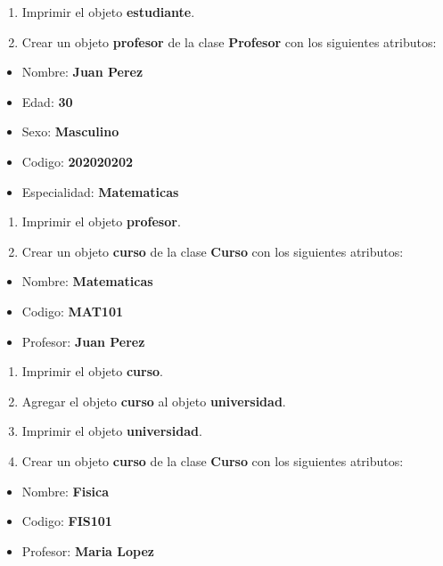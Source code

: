\documentclass[
  a4paper,
  DIV=11,
  numbers=noendperiod,
  onepage,
  openany]{scrreprt}
\begin{document}
\begin{enumerate}
\def\labelenumi{\arabic{enumi}.}
\setcounter{enumi}{8}
\item
  Imprimir el objeto \textbf{estudiante}.
\item
  Crear un objeto \textbf{profesor} de la clase \textbf{Profesor} con
  los siguientes atributos:
\end{enumerate}

\begin{itemize}
\item
  Nombre: \textbf{Juan Perez}
\item
  Edad: \textbf{30}
\item
  Sexo: \textbf{Masculino}
\item
  Codigo: \textbf{202020202}
\item
  Especialidad: \textbf{Matematicas}
\end{itemize}

\begin{enumerate}
\def\labelenumi{\arabic{enumi}.}
\setcounter{enumi}{10}
\item
  Imprimir el objeto \textbf{profesor}.
\item
  Crear un objeto \textbf{curso} de la clase \textbf{Curso} con los
  siguientes atributos:
\end{enumerate}

\begin{itemize}
\item
  Nombre: \textbf{Matematicas}
\item
  Codigo: \textbf{MAT101}
\item
  Profesor: \textbf{Juan Perez}
\end{itemize}

\begin{enumerate}
\def\labelenumi{\arabic{enumi}.}
\setcounter{enumi}{12}
\item
  Imprimir el objeto \textbf{curso}.
\item
  Agregar el objeto \textbf{curso} al objeto \textbf{universidad}.
\item
  Imprimir el objeto \textbf{universidad}.
\item
  Crear un objeto \textbf{curso} de la clase \textbf{Curso} con los
  siguientes atributos:
\end{enumerate}

\begin{itemize}
\item
  Nombre: \textbf{Fisica}
\item
  Codigo: \textbf{FIS101}
\item
  Profesor: \textbf{Maria Lopez}
\end{itemize}
\end{document}
